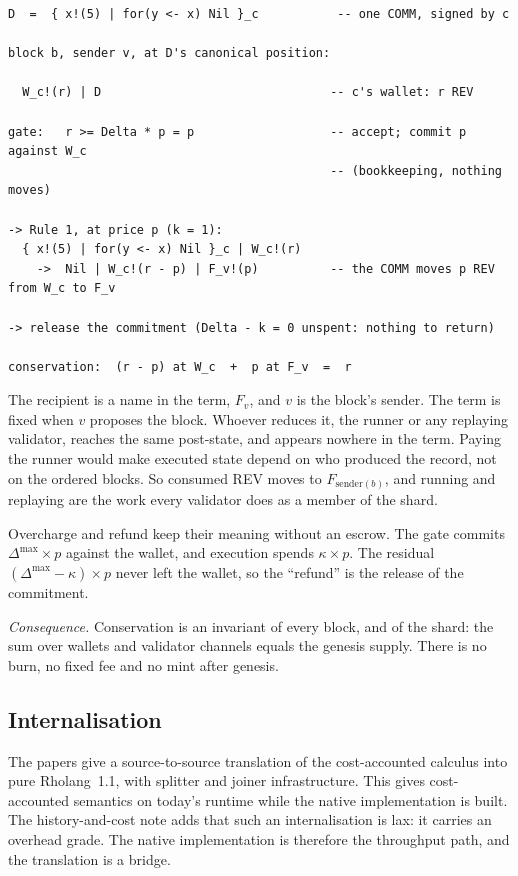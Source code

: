 \documentclass[11pt]{article}
\begin{document}
\begin{Verbatim}[fontsize=\footnotesize,frame=single,framesep=6pt]
D  =  { x!(5) | for(y <- x) Nil }_c           -- one COMM, signed by c

block b, sender v, at D's canonical position:

  W_c!(r) | D                                -- c's wallet: r REV

gate:   r >= Delta * p = p                   -- accept; commit p against W_c
                                             -- (bookkeeping, nothing moves)

-> Rule 1, at price p (k = 1):
  { x!(5) | for(y <- x) Nil }_c | W_c!(r)
    ->  Nil | W_c!(r - p) | F_v!(p)          -- the COMM moves p REV from W_c to F_v

-> release the commitment (Delta - k = 0 unspent: nothing to return)

conservation:  (r - p) at W_c  +  p at F_v  =  r
\end{Verbatim}

The recipient is a name in the term, $F_v$, and $v$ is the block's sender. The term is fixed when $v$ proposes the block. Whoever reduces it, the runner or any replaying validator, reaches the same post-state, and appears nowhere in the term. Paying the runner would make executed state depend on who produced the record, not on the ordered blocks. So consumed REV moves to $F_{\mathrm{sender}(b)}$, and running and replaying are the work every validator does as a member of the shard.

Overcharge and refund keep their meaning without an escrow. The gate commits $\Delta^{\max} \times p$ against the wallet, and execution spends $\kappa \times p$. The residual $(\Delta^{\max} - \kappa) \times p$ never left the wallet, so the ``refund'' is the release of the commitment.

\emph{Consequence.} Conservation is an invariant of every block, and of the shard: the sum over wallets and validator channels equals the genesis supply. There is no burn, no fixed fee and no mint after genesis.

\subsection{Internalisation}

The papers give a source-to-source translation of the cost-accounted calculus into pure Rholang~1.1, with splitter and joiner infrastructure. This gives cost-accounted semantics on today's runtime while the native implementation is built. The history-and-cost note adds that such an internalisation is lax: it carries an overhead grade. The native implementation is therefore the throughput path, and the translation is a bridge.
\end{document}

